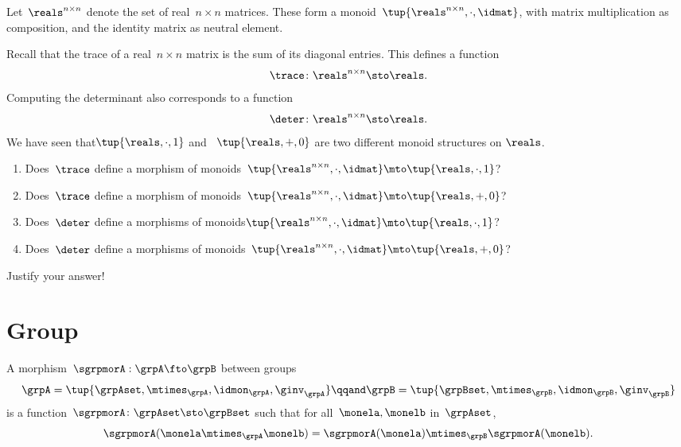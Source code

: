 \begin{gradedexercise}
  \label{ex:tr-and-det}
Let~$\reals^{n \times n}$ denote the set of real~$n \times n$ matrices. These form a monoid~$\tup{\reals^{n \times n}, \cdot, \idmat}$, with matrix multiplication as composition, and the identity matrix as neutral element.

Recall that the trace of a real~$n \times n$ matrix is the sum of its diagonal entries. This defines a function
\begin{equation}
\trace \colon \reals^{n \times n} \sto \reals.
\end{equation}
Computing the determinant also corresponds to a function
\begin{equation}
\deter \colon \reals^{n \times n} \sto \reals.
\end{equation}
We have seen that$\tup{ \reals, \cdot, 1}$ and ~$\tup{ \reals, +, 0}$ are two different monoid structures on $\reals$.
\begin{enumerate}
\item Does~$\trace$ define a morphism of monoids~$\tup{\reals^{n \times n}, \cdot, \idmat} \mto \tup{ \reals, \cdot, 1}$?
\item Does~$\trace$ define a morphism of monoids~$\tup{\reals^{n \times n}, \cdot, \idmat} \mto \tup{ \reals, + , 0}$?
\item Does~$\deter$ define a morphisms of monoids$\tup{\reals^{n \times n}, \cdot, \idmat} \mto \tup{ \reals, \cdot, 1}$?
\item Does~$\deter$ define a morphisms of monoids~$\tup{\reals^{n \times n}, \cdot, \idmat} \mto \tup{ \reals, + , 0}$?
\end{enumerate}
Justify your answer!
\end{gradedexercise}


\section{Group \whomos}





\begin{ctdefinition}
  \label{def:group-mor}
  A morphism~$\sgrpmorA: \grpA \fto \grpB$ between groups
  \begin{equation}
    \grpA = \tup{\grpAset, \mtimes_\grpA, \idmon_\grpA, \ginv_\grpA}
    \qqand
    \grpB = \tup{\grpBset, \mtimes_\grpB, \idmon_\grpB,  \ginv_\grpB}
  \end{equation}
  is a function~$\sgrpmorA \colon \grpAset \sto \grpBset$ such that
  for all~$\monela, \monelb$ in~$\grpAset$,
  \begin{equation}
    \label{eq:group-mor-comp}
    \sgrpmorA (\monela \mtimes_{\grpA} \monelb) = \sgrpmorA (\monela) \mtimes_{\grpB}  \sgrpmorA(\monelb).
  \end{equation}
\end{ctdefinition}

